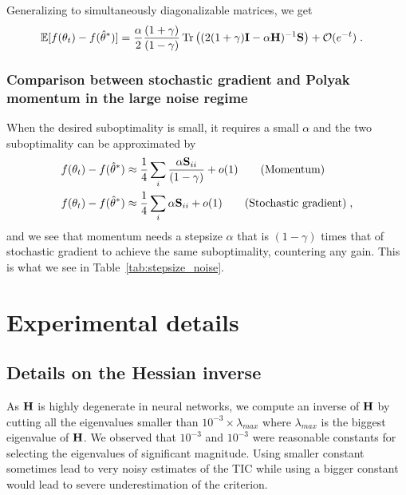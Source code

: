 Generalizing to simultaneously diagonalizable matrices, we get
\begin{align}
    \mathbb{E}[f(\theta_t) - f(\hat\theta^\ast)]    &= \frac{\alpha}{2} \frac{(1 + \gamma)}{(1 - \gamma)}\operatorname{Tr}\left((2 (1 + \gamma){\mathbf{I}} - \alpha {\mathbf{H}})^{-1} {\mathbf{S}}\right) + {\mathcal{O}}(e^{-t}) \; .
\end{align}

\subsubsection{Comparison between stochastic gradient and Polyak momentum in the large noise regime}

When the desired suboptimality is small, it requires a small $\alpha$ and the two suboptimality can be approximated by
\begin{align*}
    f(\theta_t) - f(\hat\theta^\ast)    &\approx \frac{1}{4} \sum_i\frac{\alpha {\mathbf{S}}_{ii}}{(1 - \gamma)} + o(1) \tag{Momentum}\\
    f(\theta_t) - f(\hat\theta^\ast)    &\approx \frac{1}{4} \sum_i\alpha {\mathbf{S}}_{ii} + o(1)\tag{Stochastic gradient} \; ,
\end{align*}
and we see that momentum needs a stepsize $\alpha$ that is $(1 - \gamma)$ times that of stochastic gradient to achieve the same suboptimality, countering any gain. This is what we see in Table~\ref{tab:stepsize_noise}.

\section{Experimental details}

\subsection{Details on the Hessian inverse}
\label{app:inversion}
As ${\mathbf{H}}$ is highly degenerate in neural networks, we compute an inverse of ${\mathbf{H}}$ by cutting all the eigenvalues smaller than $10^{-3} \times \lambda_{max}$ where $\lambda_{max}$ is the biggest eigenvalue of ${\mathbf{H}}$. We observed that $10^{-3}$ and $10^{-3}$ were reasonable constants for selecting the eigenvalues of significant magnitude. Using smaller constant sometimes lead to very noisy estimates of the TIC while using a bigger constant would lead to severe underestimation of the criterion.


